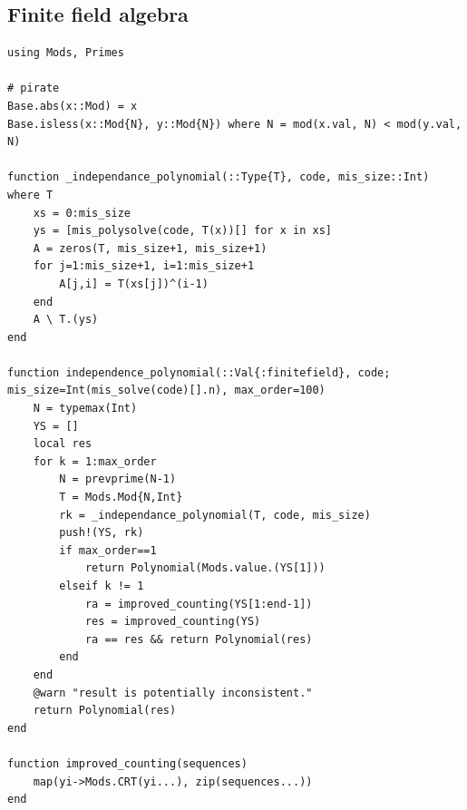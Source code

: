 \documentclass{article}
\newcommand{\<}{\langle}
\renewcommand{\>}{\rangle}
\theoremstyle{definition}\newtheorem{definition}{\textit{Definition}}
\begin{document}
\subsection{Finite field algebra}
\begin{lstlisting}
using Mods, Primes

# pirate
Base.abs(x::Mod) = x
Base.isless(x::Mod{N}, y::Mod{N}) where N = mod(x.val, N) < mod(y.val, N)

function _independance_polynomial(::Type{T}, code, mis_size::Int) where T
	xs = 0:mis_size
	ys = [mis_polysolve(code, T(x))[] for x in xs]
	A = zeros(T, mis_size+1, mis_size+1)
	for j=1:mis_size+1, i=1:mis_size+1
		A[j,i] = T(xs[j])^(i-1)
	end
	A \ T.(ys)
end

function independence_polynomial(::Val{:finitefield}, code; mis_size=Int(mis_solve(code)[].n), max_order=100)
    N = typemax(Int)
    YS = []
    local res
    for k = 1:max_order
	    N = prevprime(N-1)
        T = Mods.Mod{N,Int}
        rk = _independance_polynomial(T, code, mis_size)
        push!(YS, rk)
        if max_order==1
            return Polynomial(Mods.value.(YS[1]))
        elseif k != 1
            ra = improved_counting(YS[1:end-1])
            res = improved_counting(YS)
            ra == res && return Polynomial(res)
        end
    end
    @warn "result is potentially inconsistent."
    return Polynomial(res)
end

function improved_counting(sequences)
    map(yi->Mods.CRT(yi...), zip(sequences...))
end
\end{lstlisting}
\end{document}
